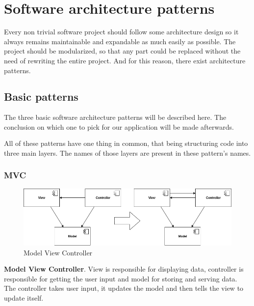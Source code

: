 
\section{Software architecture patterns}
Every non trivial software project should follow some architecture design so it always remains maintainable and expandable as much easily as possible.
The project should be modularized, so that any part could be replaced without the need of rewriting the entire project.
And for this reason, there exist architecture patterns.

\subsection{Basic patterns}


The three basic software architecture patterns will be described here.
The conclusion on which one to pick for our application will be made afterwards.

All of these patterns have one thing in common, that being structuring code into three main layers.
The names of those layers are present in these pattern's names.

\subsubsection{MVC}

\begin{figure}\centering
	\includegraphics[width=1\textwidth]{pics/patterns/bc-mvc2.png}
	\caption[MVC]{Model View Controller}\label{fig:mvc}
\end{figure}

\textbf{Model View Controller}.
View is responsible for displaying data, controller is responsible for getting the user input and model for storing and serving data.
The controller takes user input, it updates the model and then tells the view to update itself. \cite{droidcon}

